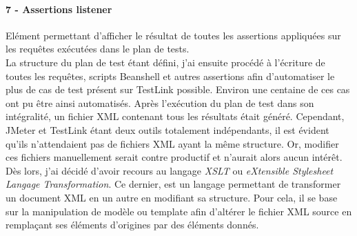 	\paragraph{7 - Assertions listener}
	Elément permettant d'afficher le résultat de toutes les assertions appliquées sur les requêtes exécutées dans le plan de tests. \\
	
	La structure du plan de test étant défini, j'ai ensuite procédé à l'écriture de toutes les requêtes, scripts Beanshell et autres assertions afin d'automatiser le plus de cas de test présent sur TestLink possible. Environ une centaine de ces cas ont pu être ainsi automatisés. Après l'exécution du plan de test dans son intégralité, un fichier XML contenant tous les résultats était généré. Cependant, JMeter et TestLink étant deux outils totalement indépendants, il est évident qu'ils n'attendaient pas de fichiers XML ayant la même structure. Or, modifier ces fichiers manuellement serait contre productif et n'aurait alors aucun intérêt. Dès lors, j'ai décidé d'avoir recours au langage \textit{XSLT} ou \textit{eXtensible Stylesheet Langage Transformation}. Ce dernier, est un langage permettant de transformer un document XML en un autre en modifiant sa structure. Pour cela, il se base sur la manipulation de modèle ou template afin d'altérer le fichier XML source en remplaçant ses éléments d'origines par des éléments donnés.